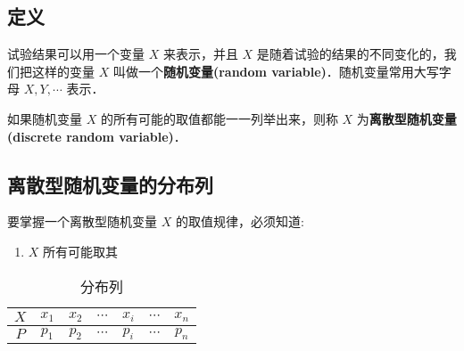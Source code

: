 
\subsection{定义}
试验结果可以用一个变量 $X$ 来表示，并且 $X$ 是随着试验的结果的不同变化的，我们把这样的变量 $X$ 叫做一个\textbf{随机变量(random variable)}．随机变量常用大写字母 $X,Y,\cdots$ 表示．

如果随机变量  $X$ 的所有可能的取值都能一一列举出来，则称 $X$ 为\textbf{离散型随机变量(discrete random variable)}．

\subsection{离散型随机变量的分布列}
要掌握一个离散型随机变量 $X$ 的取值规律，必须知道:
\begin{enumerate}
\item $X$ 所有可能取其
\end{enumerate}

\begin{table}[h]
\centering
\caption{分布列}\label{HsDRV_tab1}
\begin{tabular}{|c|c|c|c|c|c|c|}
\hline
$X$ & $x_1$ & $x_2$ & $\cdots$ & $x_i$ & $\cdots$ & $x_n$ \\
\hline
$P$ & $p_1$ & $p_2$ & $\cdots$ & $p_i$ & $\cdots$ & $p_n$ \\
\hline
\end{tabular}
\end{table}


